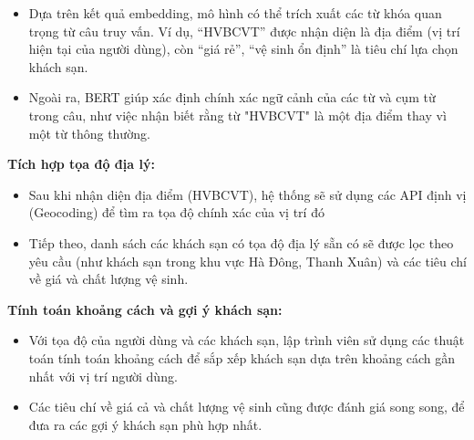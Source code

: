\begin{itemize}
    \item Dựa trên kết quả embedding, mô hình có thể trích xuất các từ khóa quan trọng từ câu truy vấn. Ví dụ, “HVBCVT” được nhận diện là địa điểm (vị trí hiện tại của người dùng), còn “giá rẻ”, “vệ sinh ổn định” là tiêu chí lựa chọn khách sạn.
    \item Ngoài ra, BERT giúp xác định chính xác ngữ cảnh của các từ và cụm từ trong câu, như việc nhận biết rằng từ "HVBCVT" là một địa điểm thay vì một từ thông thường.
\end{itemize}

\textbf{Tích hợp tọa độ địa lý:}

\begin{itemize}
    \item Sau khi nhận diện địa điểm (HVBCVT), hệ thống sẽ sử dụng các API định vị (Geocoding) để tìm ra tọa độ chính xác của vị trí đó 
    \item Tiếp theo, danh sách các khách sạn có tọa độ địa lý sẵn có sẽ được lọc theo yêu cầu (như khách sạn trong khu vực Hà Đông, Thanh Xuân) và các tiêu chí về giá và chất lượng vệ sinh.
\end{itemize}

\textbf{Tính toán khoảng cách và gợi ý khách sạn:}

\begin{itemize}
    \item Với tọa độ của người dùng và các khách sạn, lập trình viên sử dụng các thuật toán tính toán khoảng cách để sắp xếp khách sạn dựa trên khoảng cách gần nhất với vị trí người dùng.
    \item Các tiêu chí về giá cả và chất lượng vệ sinh cũng được đánh giá song song, để đưa ra các gợi ý khách sạn phù hợp nhất.
\end{itemize}

